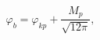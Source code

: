 \begin{equation} \label{PSboundary2}
\varphi_{b}=\varphi_{kp}+\frac{M_{p}}{\sqrt{12\pi}},
\end{equation}

